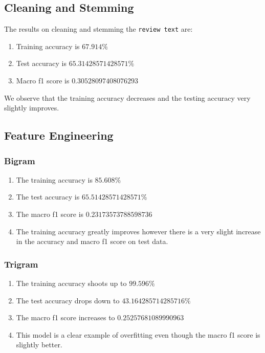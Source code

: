 \documentclass[11pt]{article}
\begin{document}
\subsection{Cleaning and Stemming}
The results on cleaning and stemming the \texttt{review text} are:
\begin{enumerate}
  \item Training accuracy is $67.914\%$
  \item Test accuracy is $65.31428571428571\%$
  \item Macro f1 score is $0.30528097408076293$
\end{enumerate}
We observe that the training accuracy decreases and the testing accuracy very slightly improves.

\subsection{Feature Engineering}

\subsubsection{Bigram}
\begin{enumerate}
  \item The training accuracy is $85.608\%$
  \item The test accuracy is $65.51428571428571\%$
  \item The macro f1 score is $0.23173573788598736$
  \item The training accuracy greatly improves however there is a very slight increase in the accuracy and macro f1 score on test data.
\end{enumerate}

\subsubsection{Trigram}
\begin{enumerate}
  \item The training accuracy shoots up to $99.596\%$
  \item The test accuracy drops down to $43.164285714285716\%$
  \item The macro f1 score increases to $0.25257681089990963$
  \item This model is a clear example of overfitting even though the macro f1 score is slightly better.
\end{enumerate}
\end{document}
